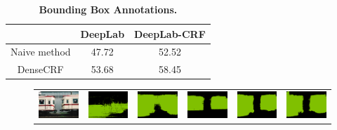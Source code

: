 \begin{table}
  \centering
  \caption{{\bf{Bounding Box Annotations.}}}
  \begin{tabular}{| c | c | c |}
    \hline
     & DeepLab & DeepLab-CRF \\
    \hline
    Naive method & 47.72 & 52.52 \\ 
    \hline
    DenseCRF     & 53.68 & 58.45 \\
    \hline
    \end{tabular}
  \label{tb:bbox_annot}
\end{table}


\begin{figure}[!htbp]
  \centering
  \scalebox{0.82} {
  \begin{tabular}{c c c c c c}
    \includegraphics[height=0.11\linewidth]{fig/val_crf_vis/img/2007_000042.jpg} &
    \includegraphics[height=0.11\linewidth]{fig/val_crf_vis/adaweak/2007_000042.png} &
    \includegraphics[height=0.11\linewidth]{fig/val_crf_vis/bbox/2007_000042.png} &
    \includegraphics[height=0.11\linewidth]{fig/val_crf_vis/bbox_crf/2007_000042.png} &
    \includegraphics[height=0.11\linewidth]{fig/val_crf_vis/strongweak/2007_000042.png} &
    \includegraphics[height=0.11\linewidth]{fig/val_crf_vis/cocomix/2007_000042.png} \\

\end{tabular}}
\end{figure}
